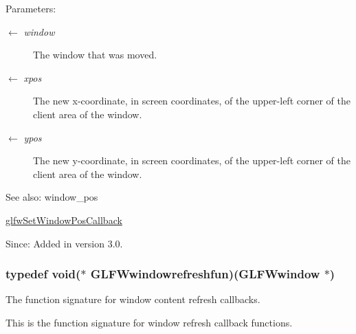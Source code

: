 \begin{Desc}
\item[Parameters:]
\begin{description}
\item[\mbox{$\leftarrow$} {\em window}]The window that was moved. \item[\mbox{$\leftarrow$} {\em xpos}]The new x-coordinate, in screen coordinates, of the upper-left corner of the client area of the window. \item[\mbox{$\leftarrow$} {\em ypos}]The new y-coordinate, in screen coordinates, of the upper-left corner of the client area of the window.\end{description}
\end{Desc}
\begin{Desc}
\item[See also:]window\_\-pos 

\hyperlink{group__window_gea610899c4cb070dcd655c6de1fe1d2c}{glfwSetWindowPosCallback}\end{Desc}
\begin{Desc}
\item[Since:]Added in version 3.0. \end{Desc}
\hypertarget{group__window_g16764f89bf2060e6fa477f0943e1412b}{
\subsubsection[GLFWwindowrefreshfun]{\setlength{\rightskip}{0pt plus 5cm}typedef void($\ast$  {\bf GLFWwindowrefreshfun})({\bf GLFWwindow} $\ast$)}}
\label{group__window_g16764f89bf2060e6fa477f0943e1412b}


The function signature for window content refresh callbacks. 

This is the function signature for window refresh callback functions.


